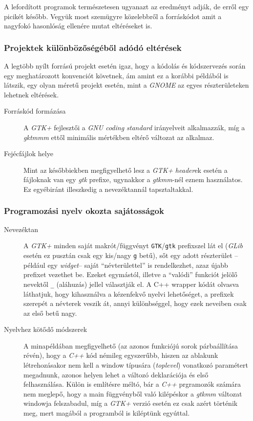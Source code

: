 \documentclass[a4paper,10pt]{article}
\begin{document}
A lefordított programok természetesen ugyanazt az eredményt adják, de erről egy picikét később. Vegyük most szemügyre közelebbről a forráskódot amit a nagyfokó hasonlóság ellenére mutat eltéréseket is.

\subsubsection{Projektek különbözőségéből adódó eltérések}

A legtöbb nyílt forrású projekt esetén igaz, hogy a kódolás és kódszervezés során egy meghatározott konvenciót követnek, ám amint ez a korábbi példából is látszik, egy olyan méretű projekt esetén, mint a \textit{GNOME} az egyes részterületeken lehetnek eltérések.

\begin{description}
 \item[Forráskód formázása] A \textit{GTK+} fejlesztői a \textit{GNU coding standard} irányelveit alkalmazzák, míg a \textit{gktmmm} ettől minimális mértékben eltérő változat az alkalmaz.

 \item[Fejécfájlok helye] Mint az későbbiekben megfigyelhető lesz a \textit{GTK+} \textit{header}ek esetén a fájloknak van egy \textit{gtk} prefixe, ugynakkor a \textit{gtkmm}-nél eznem használatos. Ez egyébiránt illeszkedig a nevezéktannál tapsztaltakkal.
 \end{description}

\subsubsection{Programozási nyelv okozta sajátosságok}

\begin{description}
 \item[Nevezéktan] A \textit{GTK+} minden saját makrót/függvényt \texttt{GTK}/\texttt{gtk} prefixszel lát el (\textit{GLib} esetén ez pusztán csak egy kis/nagy \texttt{g} betű), sőt egy adott részterület --például egy \textit{widget}-- saját ``névterülettel'' is rendelkezhet, azaz újabb prefixet vezethet be. Ezeket egymástól, illetve a ``valódi'' funkciót jelölő nevektől \texttt{\_} (aláhuzás) jellel választják el. A C++ wrapper kódát olvasva láthatjuk, hogy kihasználva a kézenfekvő nyelvi lehetőséget, a prefixek szerepét a névterek veszik át, annyi különbséggel, hogy ezek neveiben csak az első betű nagy.
 \item[Nyelvhez kötődő módszerek] A minapéldában megfigyelhető (az azonos funkciójú sorok párbaállítása révén), hogy a \textit{C++} kód némileg egyszerűbb, hiszen az ablakunk létrehozásakor nem kell a window típusára (\textit{toplevel}) vonatkozó paramétert megadnunk, azonos helyen lehet a változó deklarációja és első felhasználása. Külön is említésre méltó, bár a \textit{C++} prgramozók számára nem meglepő, hogy a main függvényből való kilépéskor a \textit{gtkmm} változat windowja felszabadul, míg a \textit{GTK+} verzió esetén ez csak azért történik meg, mert magából a programból is kiléptünk egyúttal.
\end{description}
\end{document}
